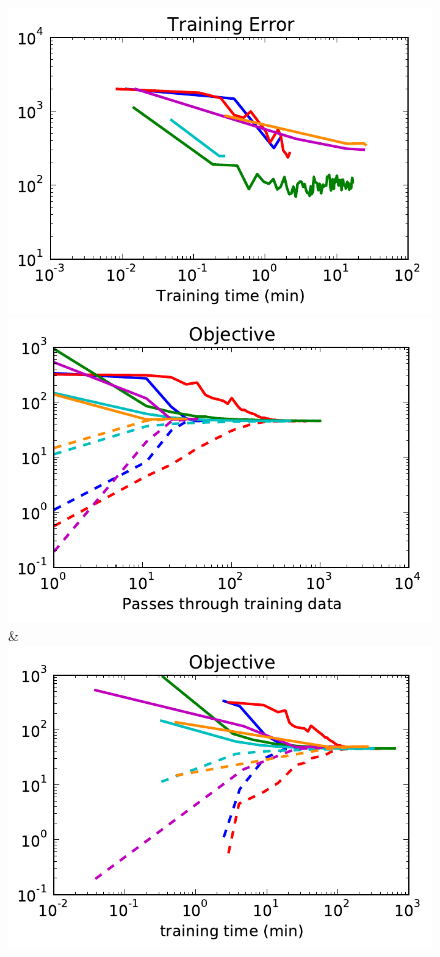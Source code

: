 \begin{figure}
\begin{tabu}
    \includegraphics[width=\linewidth]{evaluation/images/snakes_qpbo_time_loss}\\
    \includegraphics[width=\linewidth]{evaluation/images/snakes_ad3}&%
    \includegraphics[width=\linewidth]{evaluation/images/snakes_ad3_time}\\

\end{tabu}
\end{figure}
